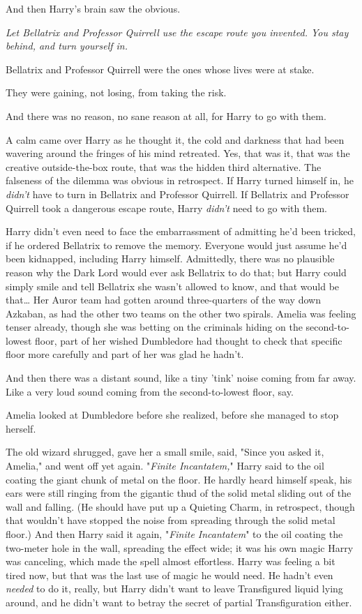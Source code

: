 And then Harry's brain saw the obvious.

\emph{Let Bellatrix and Professor Quirrell use the escape route you invented. 
You stay behind, and turn yourself in.}

Bellatrix and Professor Quirrell were the ones whose lives were at stake.

They were gaining, not losing, from taking the risk.

And there was no reason, no sane reason at all, for Harry to go with them.

A calm came over Harry as he thought it, the cold and darkness that had been 
wavering around the fringes of his mind retreated. Yes, that was it, that was 
the creative outside-the-box route, that was the hidden third alternative. The 
falseness of the dilemma was obvious in retrospect. If Harry turned himself in, 
he \emph{didn't} have to turn in Bellatrix and Professor Quirrell. If Bellatrix 
and Professor Quirrell took a dangerous escape route, Harry \emph{didn't} need 
to go with them.

Harry didn't even need to face the embarrassment of admitting he'd been 
tricked, if he ordered Bellatrix to remove the memory. Everyone would just 
assume he'd been kidnapped, including Harry himself. Admittedly, there was no 
plausible reason why the Dark Lord would ever ask Bellatrix to do that; but 
Harry could simply smile and tell Bellatrix she wasn't allowed to know, and 
that would be that{\ldots}
\sbreak
Her Auror team had gotten around three-quarters of the way down Azkaban, as had 
the other two teams on the other two spirals. Amelia was feeling tenser 
already, though she was betting on the criminals hiding on the second-to-lowest 
floor, part of her wished Dumbledore had thought to check that specific floor 
more carefully and part of her was glad he hadn't.

And then there was a distant sound, like a tiny 'tink' noise coming from far 
away. Like a very loud sound coming from the second-to-lowest floor, say.

Amelia looked at Dumbledore before she realized, before she managed to stop 
herself.

The old wizard shrugged, gave her a small smile, said, "Since you asked it, 
Amelia," and went off yet again.
\sbreak
"\emph{Finite Incantatem,}" Harry said to the oil coating the giant chunk of 
metal on the floor. He hardly heard himself speak, his ears were still ringing 
from the gigantic thud of the solid metal sliding out of the wall and falling. 
(He should have put up a Quieting Charm, in retrospect, though that wouldn't 
have stopped the noise from spreading through the solid metal floor.) And then 
Harry said it again, "\emph{Finite Incantatem}" to the oil coating the 
two-meter hole in the wall, spreading the effect wide; it was his own magic 
Harry was canceling, which made the spell almost effortless. Harry was feeling 
a bit tired now, but that was the last use of magic he would need. He hadn't 
even \emph{needed} to do it, really, but Harry didn't want to leave 
Transfigured liquid lying around, and he didn't want to betray the secret of 
partial Transfiguration either.

